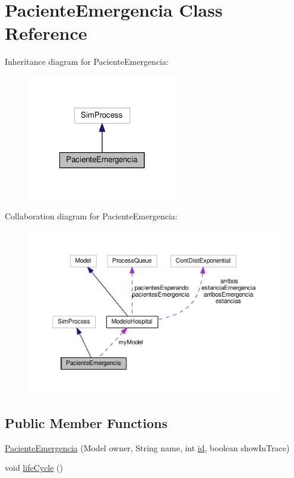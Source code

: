 \hypertarget{class_paciente_emergencia}{\section{Paciente\-Emergencia Class Reference}
\label{class_paciente_emergencia}
}


Inheritance diagram for Paciente\-Emergencia\-:\nopagebreak
\begin{figure}[H]
\begin{center}
\leavevmode
\includegraphics[width=186pt]{class_paciente_emergencia__inherit__graph}
\end{center}
\end{figure}


Collaboration diagram for Paciente\-Emergencia\-:\nopagebreak
\begin{figure}[H]
\begin{center}
\leavevmode
\includegraphics[width=350pt]{class_paciente_emergencia__coll__graph}
\end{center}
\end{figure}
\subsection*{Public Member Functions}
\begin{DoxyCompactItemize}
\item 
\hyperlink{class_paciente_emergencia_a570fc186959f4d2b2038f1f27f8fe75f}{Paciente\-Emergencia} (Model owner, String name, int \hyperlink{class_paciente_emergencia_a1e71030a4d66cf7c5ad79743c67bc17f}{id}, boolean show\-In\-Trace)
\item 
void \hyperlink{class_paciente_emergencia_a445b55bb8a640deb5a80ea142969efa7}{life\-Cycle} ()
\end{DoxyCompactItemize}
